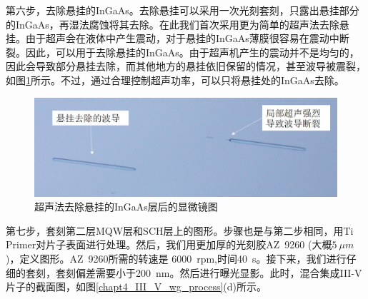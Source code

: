 第六步，去除悬挂的InGaAs。去除悬挂可以采用一次光刻套刻，只露出悬挂部分的InGaAs，再湿法腐蚀将其去除。在此我们首次采用更为简单的超声法去除悬挂。由于超声会在液体中产生震动，对于悬挂的InGaAs薄膜很容易在震动中断裂。因此，可以用于去除悬挂的InGaAs。由于超声机产生的震动并不是均匀的，因此会导致部分悬挂去除，而其他地方的悬挂依旧保留的情况，甚至波导被震裂，如图\ref{chapt4_III_V_remove_InGaAs}所示。不过，通过合理控制超声功率，可以只将悬挂处的InGaAs去除。
\begin{figure}[!h]
	\centering
	\includegraphics[width=14cm]{./Pictures/chapt4_III_V_remove_InGaAs.jpg}
	\caption{超声法去除悬挂的InGaAs层后的显微镜图}
	\label{chapt4_III_V_remove_InGaAs}
\end{figure}

第七步，套刻第二层MQW层和SCH层上的图形。步骤也是与第二步相同，用Ti Primer对片子表面进行处理。然后，我们用更加厚的光刻胶AZ~9260 (大概$5~\mu m$)，定义图形。AZ~9260所需的转速是 6000~rpm,时间40~s。接下来，我们进行仔细的套刻，套刻偏差需要小于200~nm。然后进行曝光显影。此时，混合集成III-V片子的截面图，如图\ref{chapt4_III_V_wg_process}(d)所示。

